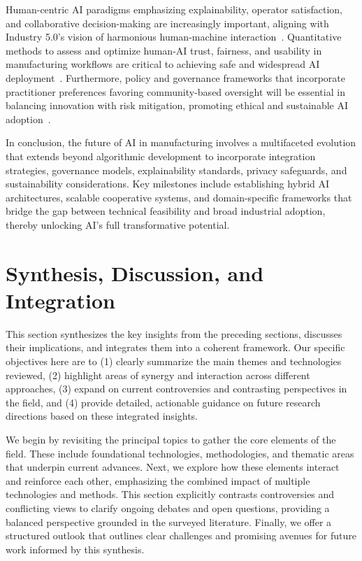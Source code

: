 \documentclass[sigconf]{acmart}
\begin{document}
Human-centric AI paradigms emphasizing explainability, operator satisfaction, and collaborative decision-making are increasingly important, aligning with Industry 5.0’s vision of harmonious human-machine interaction~\cite{ref6,ref35}. Quantitative methods to assess and optimize human-AI trust, fairness, and usability in manufacturing workflows are critical to achieving safe and widespread AI deployment~\cite{ref44}. Furthermore, policy and governance frameworks that incorporate practitioner preferences favoring community-based oversight will be essential in balancing innovation with risk mitigation, promoting ethical and sustainable AI adoption~\cite{ref25}.

In conclusion, the future of AI in manufacturing involves a multifaceted evolution that extends beyond algorithmic development to incorporate integration strategies, governance models, explainability standards, privacy safeguards, and sustainability considerations. Key milestones include establishing hybrid AI architectures, scalable cooperative systems, and domain-specific frameworks that bridge the gap between technical feasibility and broad industrial adoption, thereby unlocking AI’s full transformative potential.

\section{Synthesis, Discussion, and Integration}

This section synthesizes the key insights from the preceding sections, discusses their implications, and integrates them into a coherent framework. Our specific objectives here are to (1) clearly summarize the main themes and technologies reviewed, (2) highlight areas of synergy and interaction across different approaches, (3) expand on current controversies and contrasting perspectives in the field, and (4) provide detailed, actionable guidance on future research directions based on these integrated insights.

We begin by revisiting the principal topics to gather the core elements of the field. These include foundational technologies, methodologies, and thematic areas that underpin current advances. Next, we explore how these elements interact and reinforce each other, emphasizing the combined impact of multiple technologies and methods. This section explicitly contrasts controversies and conflicting views to clarify ongoing debates and open questions, providing a balanced perspective grounded in the surveyed literature. Finally, we offer a structured outlook that outlines clear challenges and promising avenues for future work informed by this synthesis.
\end{document}
